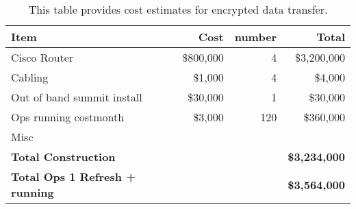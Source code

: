 \tiny \begin{longtable} {|l|r|r|r|} \caption{This table provides cost estimates for encrypted data transfer. \label{tab:ipsec}}\\ 
\hline 
\textbf{Item}&\textbf{Cost}&\textbf{number}&\textbf{Total} \\ \hline
{Cisco Router }&{\$800,000}&{4}&{\$3,200,000} \\ \hline
{Cabling}&{\$1,000}&{4}&{\$4,000} \\ \hline
{Out of band summit install}&{\$30,000}&{1}&{\$30,000} \\ \hline
{Ops running cost\/month}&{\$3,000}&{120}&{\$360,000} \\ \hline
{Misc}&&& \\ \hline
\textbf{Total Construction}&\textbf{}&\textbf{}&\textbf{\$3,234,000} \\ \hline
\textbf{Total Ops 1 Refresh  + running }&\textbf{}&\textbf{}&\textbf{\$3,564,000} \\ \hline
\end{longtable} \normalsize
